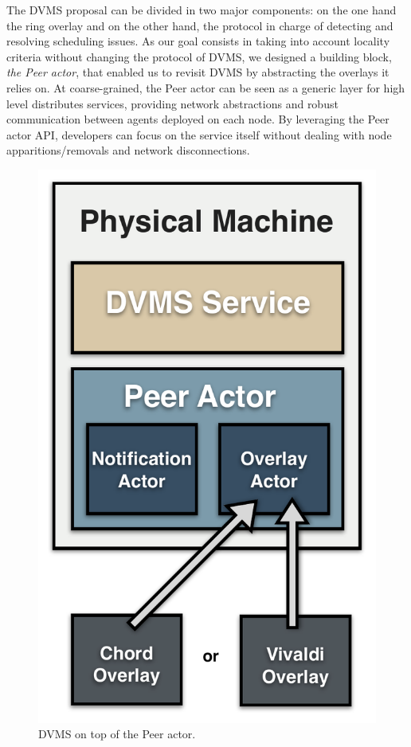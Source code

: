 The DVMS proposal can be divided in two major
components: on the one hand the ring overlay and on the other hand, the
protocol in charge of detecting and resolving scheduling issues.  As our goal
consists in taking into account locality criteria without changing the protocol
of DVMS, we designed a building block, \ie \emph{the Peer actor}, that enabled
us to revisit DVMS by abstracting the overlays it relies on.  At
coarse-grained, the Peer actor can be seen as a generic layer for high level
distributes services, providing network abstractions and robust communication
between agents deployed on each node.  By leveraging the Peer actor API,
developers can focus on the service itself without dealing with node
apparitions/removals and network disconnections. 

\begin{figure}
\vspace{-.7cm}\hspace*{.2cm}
  \includegraphics[width=\linewidth]{Figures/DVMS.pdf}
  \caption{DVMS on top of the Peer actor.}%
  \label{fig:peeractor}%
\end{figure}

